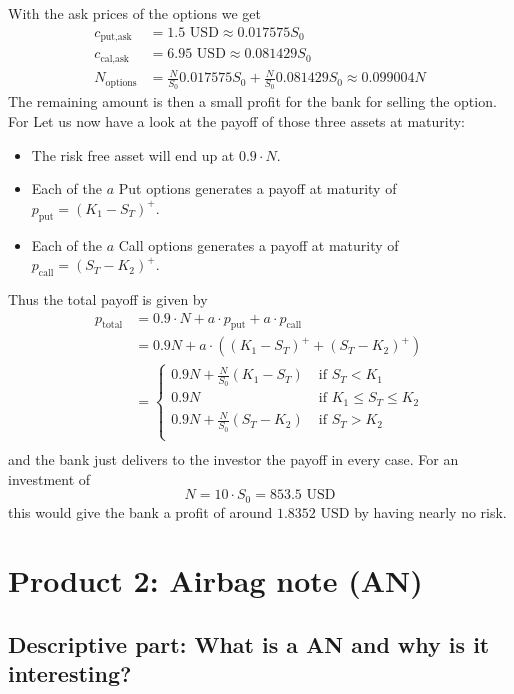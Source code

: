 \documentclass[11pt,oneside,a4paper]{article}
\begin{document}
	With the ask prices of the options we get 
	\begin{align*}
	c_{\text{put,ask}} &= 1.5 \text{ USD} \approx 0.017575 S_0 \\
	c_{\text{cal,ask}} &= 6.95 \text{ USD} \approx 0.081429 S_0  \\
	N_{\text{options}} &= \frac{N}{S_0} 0.017575 S_0 + \frac{N}{S_0} 0.081429 S_0 \approx 0.099004 N
	\end{align*}
	The remaining amount  is then a small profit for the bank for selling the option. For  Let us now have a look at the payoff of those three assets at maturity:
	\begin{itemize}
		\item The risk free asset will end up at $ 0.9\cdot N $.
		\item Each of the $ a $ Put options generates a payoff at maturity of $ p_{\text{put}} = (K_1-S_T)^{+} $.
		\item Each of the $ a $ Call options generates a payoff at maturity of $ p_{\text{call}} = (S_T- K_2)^{+} $.
	\end{itemize}
	Thus the total payoff is given by
	\begin{align*}
		p_{\text{total}} &= 0.9\cdot	N + a \cdot p_{\text{put}} + a \cdot p_{\text{call}} \\ &= 0.9N + a\cdot((K_1-S_T)^+ + (S_T- K_2)^+) \\
		&=
		\begin{cases}
				0.9N + \frac{N}{S_0}(K_1 - S_T) \; &\text{if } S_T < K_1 \\
				0.9N  \; &\text{if } K_1 \leq S_T \leq K_2 \\
				0.9N + \frac{N}{S_0}(S_T-K_2) \; &\text{if }S_T > K_2 \\
		\end{cases} \\
	\end{align*}
	and the bank just delivers to the investor the payoff in every case. 
	For an investment of \[N = 10\cdot S_0 = 853.5 \text{ USD} \] this would give the bank a profit of around $ 1.8352 \text{ USD} $ by having nearly no risk.
	
	
	

	\newpage
	\section{Product 2: Airbag note (AN)}
	\subsection{Descriptive part: What is a AN and why is it interesting?}
\end{document}
